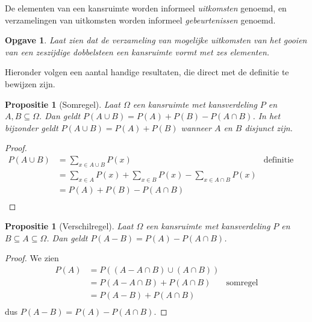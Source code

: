 \documentclass[a4paper]{book}
\newtheorem{proposition}[theorem]{Propositie}
\newtheorem{exercise}[theorem]{Opgave}
\theoremstyle{definition}
\begin{document}
De elementen van een kansruimte worden informeel \emph{uitkomsten} genoemd, en verzamelingen van uitkomsten worden informeel \emph{gebeurtenissen}
genoemd.

\begin{exercise}
    Laat zien dat de verzameling van mogelijke uitkomsten van het gooien van een zeszijdige dobbelsteen een kansruimte vormt met zes elementen.
\end{exercise}

Hieronder volgen een aantal handige resultaten, die direct met de definitie te bewijzen zijn.
\begin{proposition}[Somregel]\label{somregel}
    Laat $\Omega$ een kansruimte met kansverdeling $P$ en $A,B \subseteq \Omega$.
    Dan geldt $P(A \cup B) = P(A) + P(B) - P(A \cap B)$.
    In het bijzonder geldt $P(A \cup B) = P(A) + P(B)$ wanneer $A$ en $B$ disjunct zijn.
\end{proposition}
\begin{proof}
    \begin{align*}
        P(A \cup B)     &= \sum_{x \in A \cup B} P(x) & \text{definitie kansverdeling}\\
                        &= \sum_{x \in A} P(x) + \sum_{x \in B} P(x) - \sum_{x \in A \cap B} P(x) \\
                        &= P(A) + P(B) - P(A \cap B) \\
    \end{align*}
\end{proof}

\begin{proposition}[Verschilregel]\label{verschilregel}
    Laat $\Omega$ een kansruimte met kansverdeling $P$ en $B \subseteq A \subseteq \Omega$.
    Dan geldt $P(A - B) = P(A) - P(A \cap B) $.
\end{proposition}
\begin{proof}
    We zien
    \begin{align*}
        P(A)    &= P( (A - A \cap B) \cup (A \cap B) ) \\
                &= P(A - A \cap B ) + P(A \cap B) & \text{somregel} \\
                &= P(A - B) + P(A \cap B) \\
    \end{align*}
    dus $P(A - B) = P(A) - P(A \cap B) $.
\end{proof}
\end{document}
